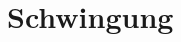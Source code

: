 



\chapter{Schwingung}
\newpage

\newpage
\begin{comment}
\begin{tabular}{ll}
$\omega:$       & Kreisfrequenz \\
$f:$            & Frequenz \\
$T:$            & Periodendauer \\
$A:$            & Amplitude \\
$\phi:$         & Phasenverschiebung \\
$x:$            & Auslenkung \\
$\theta:$       & Auslenkwinkel \\
$I:$            & Trägheitsmoment $[kg m^2]$ \\
$k:$            & Federkonstante $[\frac{N}{m}]$ \\
$\kappa:$       & Rotationsfederkonstante $[Nm]$ \\
$d:$            & Abstand Massenschwerpunkt zu Drehachse \\
$L:$            & Pendellänge \\
$\ell:$         & Länge der Flüssigkeitssäule \\
$\beta:$        & Abklingkonstante $[s^{-1}]$ \\
$b:$            & Dämpfungskonstante $[\frac{kg}{s}]$ \\
$\tau:$         & Zeitkonstante, Zerfallszeit $[s]$ \\
$Q:$            & Güte \\
$H:$            & Erregerauslenkung \\
$\Omega_R:$     & Resonanzkreisfrequenz \\
$\Delta\Omega:$ & Kurvenbreite, Bandbreite \\
\end{tabular}
\end{comment}


